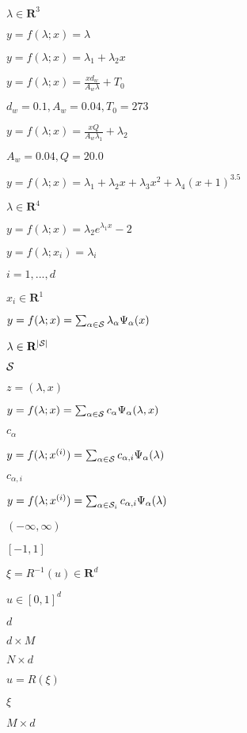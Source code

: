 \documentclass{article}
\begin{document}
$\lambda\in\mathbf{R}^3$
\pagebreak

$y=f(\lambda;x)=\lambda$
\pagebreak

$y=f(\lambda;x)=\lambda_1+\lambda_2x$
\pagebreak

$y=f(\lambda;x)=\frac{x d_w}{A_w \lambda}+T_0$
\pagebreak

$d_w=0.1, A_w=0.04, T_0=273$
\pagebreak

$y=f(\lambda;x)=\frac{x Q}{A_w \lambda_1}+\lambda_2$
\pagebreak

$A_w=0.04, Q=20.0$
\pagebreak

$y=f(\lambda;x)=\lambda_1+\lambda_2 x+\lambda_3 x^2+ \lambda_4 (x+1)^{3.5}$
\pagebreak

$\lambda\in\mathbf{R}^4$
\pagebreak

$y=f(\lambda;x)=\lambda_2 e^{\lambda_1 x} - 2$
\pagebreak

$y=f(\lambda;x_i)=\lambda_i$
\pagebreak

$i=1,...,d$
\pagebreak

$x_i\in\mathbf{R}^1$
\pagebreak

$y=f(\lambda;x)=\sum_{\alpha\in{\cal S}} \lambda_\alpha \Psi_\alpha(x)$
\pagebreak

$\lambda\in\mathbf{R}^{|{\cal S}|}$
\pagebreak

${\cal S}$
\pagebreak

$z=(\lambda,x)$
\pagebreak

$y=f(\lambda;x)=\sum_{\alpha\in{\cal S}} c_\alpha \Psi_\alpha(\lambda,x)$
\pagebreak

$c_\alpha$
\pagebreak

$y=f(\lambda;x^{(i)})=\sum_{\alpha\in{\cal S}} c_{\alpha,i} \Psi_\alpha(\lambda)$
\pagebreak

$c_{\alpha,i}$
\pagebreak

$y=f(\lambda;x^{(i)})=\sum_{\alpha\in{\cal S}_i} c_{\alpha,i} \Psi_\alpha(\lambda)$
\pagebreak

$(-\infty,\infty)$
\pagebreak

$[-1,1]$
\pagebreak

$\xi=R^{-1}(u)\in\mathbf{R}^d$
\pagebreak

$u\in[0,1]^d$
\pagebreak

$d$
\pagebreak

$d\times M$
\pagebreak

$N\times d$
\pagebreak

$u=R(\xi)$
\pagebreak

$\xi$
\pagebreak

$M\times d$
\pagebreak
\end{document}
